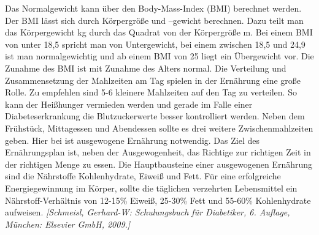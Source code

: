 \documentclass[a4paper,11pt]{article}%
\renewcommand{\\}{\vspace*{0.5\baselineskip} \newline}
\begin{document}
	Das Normalgewicht kann über den Body-Mass-Index (BMI) berechnet werden. Der BMI lässt sich durch Körpergröße und –gewicht berechnen. Dazu teilt man das Körpergewicht kg durch das Quadrat von der Körpergröße m.\newline
	Bei einem BMI von unter 18,5 spricht man von Untergewicht, bei einem zwischen 18,5 und 24,9 ist man normalgewichtig und ab einem BMI von 25 liegt ein Übergewicht vor. Die Zunahme des BMI ist mit Zunahme des Alters normal.\newline
	Die Verteilung und Zusammensetzung der Mahlzeiten am Tag spielen in der Ernährung eine große Rolle. Zu empfehlen sind 5-6 kleinere Mahlzeiten auf den Tag zu verteilen. So kann der Heißhunger vermieden werden und gerade im Falle einer Diabeteserkrankung die Blutzuckerwerte besser kontrolliert werden. Neben dem Frühstück, Mittagessen und Abendessen sollte es drei weitere Zwischenmahlzeiten geben. Hier bei ist ausgewogene Ernährung notwendig. Das Ziel des Ernährungsplan ist, neben der Ausgewogenheit, das Richtige zur richtigen Zeit in der richtigen Menge zu essen. Die Hauptbausteine einer ausgewogenen Ernährung sind die Nährstoffe Kohlenhydrate, Eiweiß und Fett. Für eine erfolgreiche Energiegewinnung im Körper, sollte die täglichen verzehrten Lebensmittel ein Nährstoff-Verhältnis von 12-15\% Eiweiß, 25-30\% Fett und 55-60\% Kohlenhydrate aufweisen. \emph{[Schmeisl, Gerhard-W: Schulungsbuch für Diabetiker, 6. Auflage, München: Elsevier GmbH, 2009.]} 
		
\end{document}
